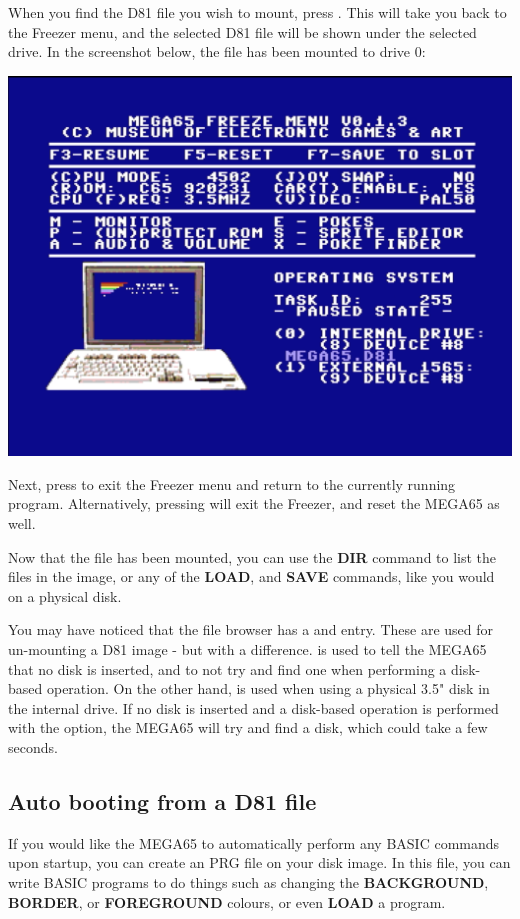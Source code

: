 When you find the D81 file you wish to mount, press .
This will take you back to the Freezer menu, and the selected D81 file will be shown under the selected drive.
In the screenshot below, the   file has been mounted to drive 0:

\begin{center}
\includegraphics[trim= 10mm 20mm 10mm 20mm,clip,width=0.7\linewidth]{images/freezer-chosen-d81.png}
\end{center}

Next, press  to exit the Freezer menu and return to the currently running program. Alternatively,
pressing  will exit the Freezer, and reset the MEGA65 as well.

Now that the file has been mounted, you can use
the {\bf DIR} command to list the files in the image, or any of the {\bf LOAD}, and {\bf SAVE} commands, like you
would on a physical disk.

You may have noticed that the file browser has a  and 
entry. These are used for un-mounting a D81 image - but with a difference.  is used to tell
the MEGA65 that no disk is inserted, and to not try and find one when performing a disk-based operation. On the other
hand,  is used when using a physical 3.5" disk in the internal drive. If no disk is
inserted and a disk-based operation is performed with the  option, the MEGA65 will
try and find a disk, which could take a few seconds.


\subsection{Auto booting from a D81 file}
If you would like the MEGA65 to automatically perform any BASIC commands upon startup, you can create an
 PRG file on your disk image. In this file, you can write BASIC programs to do things such
as changing the {\bf BACKGROUND}, {\bf BORDER}, or {\bf FOREGROUND} colours, or even {\bf LOAD} a program.

